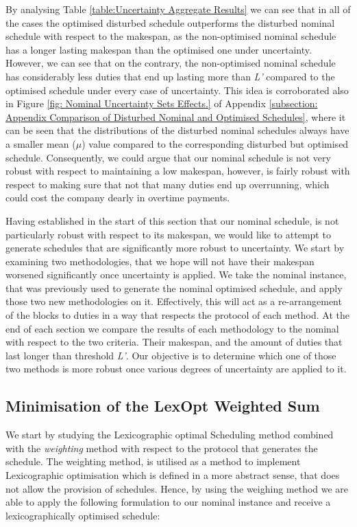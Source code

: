 \vspace{\baselineskip}
\noindent
By analysing Table \ref{table:Uncertainty Aggregate Results} we can see that in all of the cases the optimised disturbed schedule outperforms the disturbed nominal schedule with respect to the makespan, as the non-optimised nominal schedule has a longer lasting makespan than the optimised one under uncertainty. However, we can see that on the contrary, the non-optimised nominal schedule has considerably less duties that end up lasting more than \textit{L'} compared to the optimised schedule under every case of uncertainty. This idea is corroborated also in Figure \ref{fig: Nominal Uncertainty Sets Effects.} of Appendix \ref{subsection: Appendix Comparison of Disturbed Nominal and Optimised Schedules}, where it can be seen that the distributions of the disturbed nominal schedules always have a smaller mean ($\mu$) value compared to the corresponding disturbed but optimised schedule. Consequently, we could argue that our nominal schedule is not very robust with respect to maintaining a low makespan, however, is fairly robust with respect to making sure that not that many duties end up overrunning, which could cost the company dearly in overtime payments.

Having established in the start of this section that our nominal schedule, is not particularly robust with respect to its makespan, we would like to attempt to generate schedules that are significantly more robust to uncertainty. We start by examining two methodologies, that we hope will not have their makespan worsened significantly once uncertainty is applied. We take the nominal instance, that was previously used to generate the nominal optimised schedule, and apply those two new methodologies on it. Effectively, this will act as a re-arrangement of the blocks to duties in a way that respects the protocol of each method. At the end of each section we compare the results of each methodology to the nominal with respect to the two criteria. Their makespan, and the amount of duties that last longer than threshold \textit{L'}. Our objective is to determine which one of those two methods is more robust once various degrees of uncertainty are applied to it. 

\subsection*{Minimisation of the LexOpt Weighted Sum}
We start by studying the Lexicographic optimal Scheduling method combined with the \textit{weighting} method with respect to the protocol that generates the schedule. The weighting method, is utilised as a method to implement Lexicographic optimisation which is defined in a more abstract sense, that does not allow the provision of schedules. Hence, by using the weighing method we are able to apply the following formulation to our nominal instance and receive a lexicographically optimised schedule:


